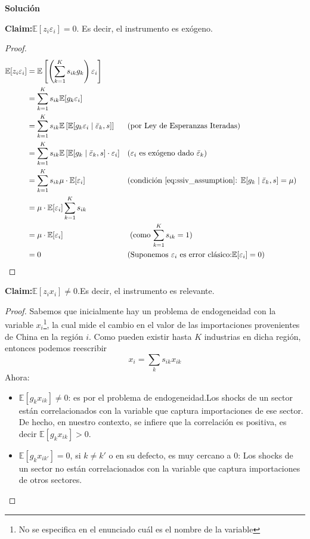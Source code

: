 \documentclass[a4paper, answers, addpoints, 11pt]{exam}
\newenvironment{solucion}{%
  \begin{mdframed}[
    backgroundcolor=blue!5,    %
    linecolor=blue!50,          %
    linewidth=2pt,              %
    leftmargin=10pt,            %
    rightmargin=8pt,           %
    topline=true,              %
    bottomline=true,            %
    roundcorner=10pt,           %
    innerleftmargin=10pt,       %
    innerrightmargin=10pt,      %
    innerbottommargin=10pt,     %
    innertopmargin=10pt         %
  ]%
  \begin{tcolorbox}[colframe=blue!50!black, colback=blue!50, coltitle=white, sharp corners=all, boxrule=1mm, width=\textwidth, halign=left, valign=center, top=0mm, bottom=0mm, left=0mm, right=0mm] \textbf{Solución} \end{tcolorbox} }{\end{mdframed}}
\begin{document}
\begin{enumerate}
\begin{solucion}
    \textbf{Claim:}$\mathbb{E}[z_i \varepsilon_i]=0$. Es decir, el instrumento es exógeno.
    \begin{proof}
\begin{align*}
\mathbb{E}[z_i \varepsilon_i] 
&= \mathbb{E} \left[ \left( \sum_{k=1}^K s_{ik} g_k \right) \varepsilon_i \right]  \\
&= \sum_{k=1}^K s_{ik} \mathbb{E}[g_k \varepsilon_i] \\
&= \sum_{k=1}^K s_{ik} \mathbb{E}\left[ \mathbb{E}[g_k \varepsilon_i \mid \bar{\varepsilon}_k, s] \right] && \text{(por Ley de Esperanzas Iteradas)} \\
&= \sum_{k=1}^K s_{ik} \mathbb{E}\left[ \mathbb{E}[g_k \mid \bar{\varepsilon}_k, s] \cdot \varepsilon_i \right] && \text{($\varepsilon_i$ es exógeno dado $ \bar{\varepsilon}_k$)} \\
&= \sum_{k=1}^K s_{ik} \mu \cdot \mathbb{E}[\varepsilon_i] && \text{(condición \ref{eq:ssiv_assumption}: } \mathbb{E}[g_k \mid \bar{\varepsilon}_k, s] = \mu) \\
&= \mu \cdot \mathbb{E}[\varepsilon_i] \sum_{k=1}^K s_{ik}  \\
&= \mu \cdot \mathbb{E}[\varepsilon_i] && \text{ (como $\sum_{k=1}^K s_{ik} = 1$)} \\
&= 0 && \text{(Suponemos $\varepsilon_i$ es error clásico:} \mathbb{E}[\varepsilon_i] = 0)
\end{align*}
    \end{proof}

    \textbf{Claim:}$\mathbb{E}[z_ix_i]\neq 0$.Es decir, el instrumento es relevante.
    \begin{proof}
    Sabemos que inicialmente hay un problema de endogeneidad con la variable \( x_i \)\footnote{No se especifica en el enunciado cuál es el nombre de la variable}, la cual mide el cambio en el valor de las importaciones
provenientes de China en la región $i$. Como pueden existir hasta $K$ industrias en dicha región, entonces podemos reescribir  $$x_i = \sum_k s_{ik} x_{ik} $$ Ahora:

\begin{itemize}
    \item $ \mathbb{E}[g_k x_{ik}] \neq 0$: es por el problema de endogeneidad.Los shocks de un sector están correlacionados con la variable que captura importaciones de ese sector.  De hecho, en nuestro contexto, se infiere que  la correlación es positiva, es decir $\mathbb{E}[g_k x_{ik}] > 0 $. 

    \item $\mathbb{E}[g_k x_{ik'}] = 0$, si \( k \neq k' \) o en su defecto, es muy cercano a 0: Los shocks de un sector no están correlacionados con la variable que captura importaciones de otros sectores. 
    


\end{itemize}
\end{proof}
\end{solucion}
\end{enumerate}
\end{document}
